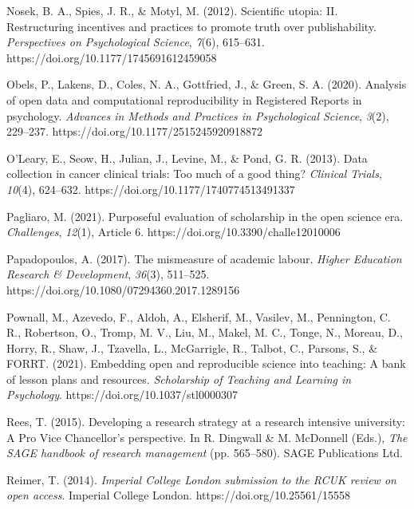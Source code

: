 \documentclass[meta, authordate]{jote-new-article}
\begin{document}
Nosek, B. A., Spies, J. R., & Motyl, M. (2012). Scientific utopia: II. Restructuring incentives and practices to promote truth over publishability. \emph{Perspectives on Psychological Science}, \emph{7}(6), 615–631. https://doi.org/10.1177/1745691612459058



Obels, P., Lakens, D., Coles, N. A., Gottfried, J., & Green, S. A. (2020). Analysis of open data and computational reproducibility in Registered Reports in psychology. \emph{Advances in Methods and Practices in Psychological Science}, \emph{3}(2), 229–237. https://doi.org/10.1177/2515245920918872



O’Leary, E., Seow, H., Julian, J., Levine, M., & Pond, G. R. (2013). Data collection in cancer clinical trials: Too much of a good thing? \emph{Clinical Trials}, \emph{10}(4), 624–632. https://doi.org/10.1177/1740774513491337



Pagliaro, M. (2021). Purposeful evaluation of scholarship in the open science era. \emph{Challenges}, \emph{12}(1), Article 6. https://doi.org/10.3390/challe12010006



Papadopoulos, A. (2017). The mismeasure of academic labour. \emph{Higher Education Research & Development}, \emph{36}(3), 511–525. https://doi.org/10.1080/07294360.2017.1289156



Pownall, M., Azevedo, F., Aldoh, A., Elsherif, M., Vasilev, M., Pennington, C. R., Robertson, O., Tromp, M. V., Liu, M., Makel, M. C., Tonge, N., Moreau, D., Horry, R., Shaw, J., Tzavella, L., McGarrigle, R., Talbot, C., Parsons, S., & FORRT. (2021). Embedding open and reproducible science into teaching: A bank of lesson plans and resources. \emph{Scholarship of Teaching and Learning in Psychology}. https://doi.org/10.1037/stl0000307



Rees, T. (2015). Developing a research strategy at a research intensive university: A Pro Vice Chancellor’s perspective. In R. Dingwall & M. McDonnell (Eds.), \emph{The SAGE handbook of research management} (pp. 565–580). SAGE Publications Ltd.



Reimer, T. (2014). \emph{Imperial College London submission to the RCUK review on open access}. Imperial College London. https://doi.org/10.25561/15558
\end{document}
